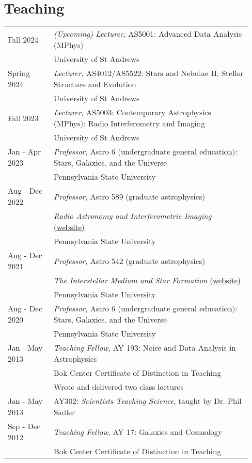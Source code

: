 \section*{Teaching}
\begin{tabular*}{\textwidth}{@{\hspace{10pt}}p{1.4in}l}
Fall 2024 & \emph{(Upcoming)} \emph{Lecturer}, AS5001: Advanced Data Analysis (MPhys)\\
& University of St Andrews \\
Spring 2024 & \emph{Lecturer}, AS4012/AS5522: Stars and Nebulae II, Stellar Structure and Evolution \\
& University of St Andrews \\
Fall 2023 & \emph{Lecturer}, AS5003: Contemporary Astrophysics (MPhys): Radio Interferometry and Imaging \\
& University of St Andrews \\
Jan - Apr 2023 & \emph{Professor}, Astro 6 (undergraduate general education): Stars, Galaxies, and the Universe\\
& Pennsylvania State University \\    
Aug - Dec 2022 & \emph{Professor}, Astro 589 (graduate astrophysics)\\
& \emph{Radio Astronomy and Interferometric Imaging} \href{https://iancze.github.io/courses/astro589/}{(website)}\\    
& Pennsylvania State University \\ 
Aug - Dec 2021 & \emph{Professor}, Astro 542 (graduate astrophysics)\\
& \emph{The Interstellar Medium and Star Formation} \href{https://iancze.github.io/courses/astro542/}{(website)}\\    
& Pennsylvania State University \\ 
Aug - Dec 2020 & \emph{Professor}, Astro 6 (undergraduate general education): Stars, Galaxies, and the Universe\\
& Pennsylvania State University \\ 
Jan - May 2013 & \emph{Teaching Fellow}, AY 193: Noise and Data Analysis in Astrophysics\\
& Bok Center Certificate of Distinction in Teaching\\
& Wrote and delivered two class lectures\\
Jan - May 2013 & AY302: \emph{Scientists Teaching Science}, taught by Dr. Phil Sadler\\
Sep - Dec 2012 & \emph{Teaching Fellow}, AY 17: Galaxies and Cosmology\\
& Bok Center Certificate of Distinction in Teaching\\
\end{tabular*}
